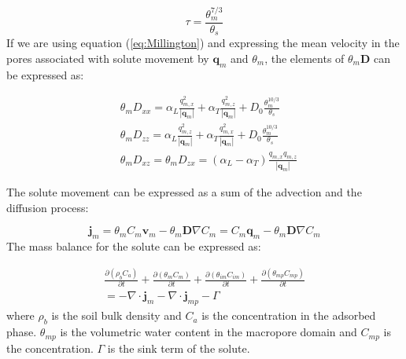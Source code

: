 \documentclass{report}
\begin{document}
\begin{equation}
\tau=\frac{\theta_{m}^{7/3}}{\theta_s} \label{eq:Millington}
\end{equation}
%
If we are using equation (\ref{eq:Millington}) and expressing the
mean velocity in the pores associated with solute movement by
$\mathbf{q}_{m}$ and $\theta_{m}$, the elements of
$\theta_{m}\mathbf{D}$ can be expressed as:

\begin{equation}
\begin{split}
&\theta_{m}
D_{xx}=\alpha_L\frac{q_{m,x}^{2}}{|\mathbf{q}_m|}+\alpha_T\frac{q_{m,z}^{2}}
{|\mathbf{q}_{m}|}+D_0\frac{\theta_{m}^{10/3}}{\theta_s} \\
&\theta_{m}
D_{zz}=\alpha_L\frac{q_{m,z}^{2}}{|\mathbf{q}_{m}|}+\alpha_T\frac{q_{m,x}^{2}}
{|\mathbf{q}_{m}|}+D_0\frac{\theta_{m}^{10/3}}{\theta_s} \\
&\theta_{m} D_{xz}=\theta_{m}
  D_{zx}=(\alpha_L-\alpha_T)\frac{q_{m,x}q_{m,z}}{|\mathbf{q}_{m}|}
\end{split}
\label{eq:thetad}
\end{equation}

The solute movement can be expressed as a sum of the advection and
the diffusion process:

\begin{equation}
\mathbf{j}_{m}=\theta_{m} C_{m}\mathbf{v}_{m}
-\theta_{m}\mathbf{D}\nabla C_{m}=C_{m}
\mathbf{q}_{m}-\theta_{m}\mathbf{D}\nabla C_{m}
\label{eq:soltransport}
\end{equation}
%
The mass balance for the solute
can be expressed as:


\begin{eqnarray}
\frac{\partial (\rho_b C_a)}{\partial t} + \frac{\partial
(\theta_{m}
  C_{m})}{\partial t} + \frac{\partial (\theta_{im}
  C_{im})}{\partial t} + \frac{\partial (\theta_{mp}
  C_{mp})}{\partial t} \nonumber \\ =-\nabla \cdot \mathbf{j}_{m}-\nabla
  \cdot \mathbf{j}_{mp} - \Gamma
\label{eq:solmassbal_tot}
\end{eqnarray}
%
where $\rho_b$ is the soil bulk density and $C_a$ is the
concentration in the adsorbed phase. $\theta_{mp}$
is the volumetric water content in the macropore domain and $C_{mp}$
is the concentration. $\Gamma$ is the sink term of the solute.
\end{document}
